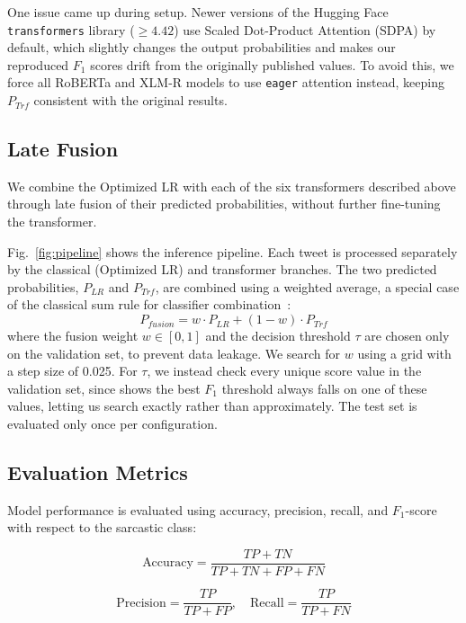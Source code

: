 \documentclass[conference]{IEEEtran}
\begin{document}
One issue came up during setup. Newer versions of the Hugging Face \texttt{transformers} library ($\geq 4.42$) use Scaled Dot-Product Attention (SDPA) by default, which slightly changes the output probabilities and makes our reproduced $F_1$ scores drift from the originally published values. To avoid this, we force all RoBERTa and XLM-R models to use \texttt{eager} attention instead, keeping $P_{Trf}$ consistent with the original results.

\subsection{Late Fusion}

We combine the Optimized LR with each of the six transformers described above through late fusion of their predicted probabilities, without further fine-tuning the transformer.

Fig.~\ref{fig:pipeline} shows the inference pipeline. Each tweet is processed separately by the classical (Optimized LR) and transformer branches. The two predicted probabilities, $P_{LR}$ and $P_{Trf}$, are combined using a weighted average, a special case of the classical sum rule for classifier combination~\cite{kittler1998combining}:
\begin{equation}
    P_{fusion} = w \cdot P_{LR} + (1 - w) \cdot P_{Trf}
\end{equation}
where the fusion weight $w \in [0, 1]$ and the decision threshold $\tau$ are chosen only on the validation set, to prevent data leakage. We search for $w$ using a grid with a step size of 0.025. For $\tau$, we instead check every unique score value in the validation set, since \cite{lipton2014} shows the best $F_1$ threshold always falls on one of these values, letting us search exactly rather than approximately. The test set is evaluated only once per configuration.

\subsection{Evaluation Metrics}
Model performance is evaluated using accuracy, precision, recall, and $F_1$-score with respect to the sarcastic class:

\begin{equation}
\text{Accuracy} = \frac{TP + TN}{TP + TN + FP + FN}
\label{eq:acc}
\end{equation}

\begin{equation}
\text{Precision} = \frac{TP}{TP + FP}, \quad \text{Recall} = \frac{TP}{TP + FN}
\label{eq:pr}
\end{equation}
\end{document}
